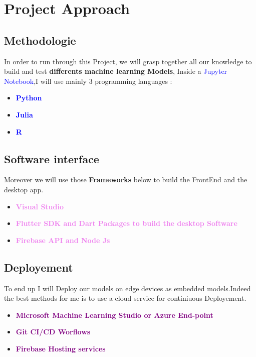 \documentclass[rnd]{mas_proposal}
\begin{document}
\section{Project Approach}

\subsection{Methodologie}
In order to run through this Project, we will grasp together all our knowledge to build and test \textbf{differents machine learning Models},
Inside a \textcolor{blue}{Jupyter Notebook},I will use mainly 3 programming languages : 

\begin{itemize}
    \item \textbf{\textcolor{blue}{Python}}
    \item \textbf{\textcolor{blue}{Julia}}
    \item \textbf{\textcolor{blue}{R}}
\end{itemize}

\subsection{Software interface }

Moreover we will use those \textbf{Frameworks} below to build the FrontEnd and the desktop app.
\begin{itemize}
    \item \textbf{\textcolor{violet}{Visual Studio}}
    \item \textbf{\textcolor{violet}{Flutter SDK and Dart Packages to build the desktop Software} }
    \item \textbf{\textcolor{violet}{ Firebase  API and Node Js }}
\end{itemize}

\subsection{Deployement }
To end up I will Deploy our models on edge devices as embedded models.Indeed the best methods for me is to use a cloud service for continiuous Deployement.
\begin{itemize}
    \item \textbf{\textcolor{purple}{Microsoft Machine Learning Studio or Azure End-point}}
    \item \textbf{\textcolor{purple}{Git CI/CD Worflows}}
    \item  \textbf{\textcolor{purple}{Firebase Hosting services}}
\end{itemize}


\nocite{*}
\end{document}
